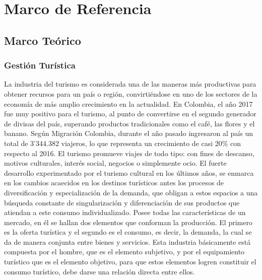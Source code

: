 \documentclass[12pt,letterpaper,openany]{book}
\begin{document}
\chapter{Marco de Referencia}\label{cap.marco_de_referencia}

\section{Marco Teórico}
\subsection{Gestión Turística}
La industria del turismo es considerada una de las maneras más productivas para obtener recursos para un país o región, convirtiéndose en uno de los sectores de la economía de más amplio crecimiento en la actualidad. En Colombia, el año 2017 fue muy positivo para el turismo, al punto de convertirse en el segundo generador de divisas del país, superando productos tradicionales como el café, las flores y el banano. Según Migración Colombia, durante el año pasado ingresaron al país un total de 3’344.382 viajeros, lo que representa un crecimiento de casi 20\% con respecto al 2016\cite{6}.
\vspace{5mm}\newline
El turismo promueve viajes de todo tipo: con fines de descanso, motivos culturales, interés social, negocios o simplemente ocio. El fuerte desarrollo experimentado por el turismo cultural en los últimos años, se enmarca en los cambios acaecidos en los destinos turísticos antes los procesos de diversificación y especialización de la demanda, que obligan a estos espacios a una búsqueda constante de singularización y diferenciación de sus productos que atiendan a este consumo individualizado\cite{7}.
\vspace{5mm}\newline
Posee todas las características de un mercado, en él se hallan dos elementos que conforman la producción. El primero es la oferta turística y el segundo es el consumo, es decir, la demanda, la cual se da de manera conjunta entre bienes y servicios. Esta industria básicamente está compuesta por el hombre, que es el elemento subjetivo, y por el equipamiento turístico que es el elemento objetivo, para que estos elementos logren constituir el consumo turístico, debe darse una relación directa entre ellos\cite{8}. 
\end{document}
